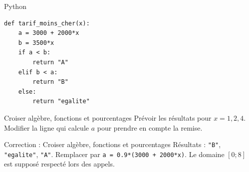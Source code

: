 \documentclass[aspectratio=169,10pt]{beamer}
\begin{document}
\begin{frame}[fragile]{Python}
\small
\begin{verbatim}
def tarif_moins_cher(x):
    a = 3000 + 2000*x
    b = 3500*x
    if a < b:
        return "A"
    elif b < a:
        return "B"
    else:
        return "egalite"
\end{verbatim}
\end{frame}
\begin{frame}{Croiser algèbre, fonctions et pourcentages}
Prévoir les résultats pour \(x=1,2,4\). Modifier la ligne qui calcule \(a\) pour prendre en compte la remise.
\end{frame}
\begin{frame}{Correction : Croiser algèbre, fonctions et pourcentages}
Résultats : \texttt{"B"}, \texttt{"egalite"}, \texttt{"A"}. Remplacer par \texttt{a = 0.9*(3000 + 2000*x)}. Le domaine \([0;8]\) est supposé respecté lors des appels.
\end{frame}
\end{document}
